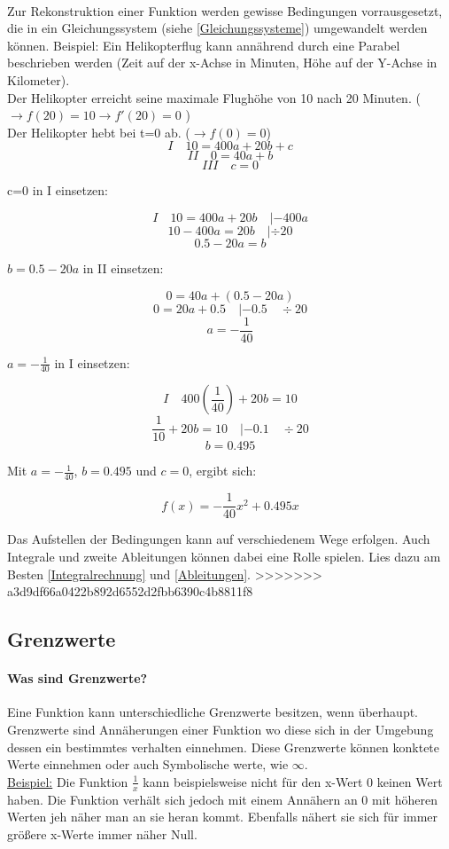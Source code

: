 \documentclass{article}
\begin{document}
\paragraph{}
Zur Rekonstruktion einer Funktion werden gewisse Bedingungen vorrausgesetzt, die in ein Gleichungssystem (siehe \ref{Gleichungssysteme}) umgewandelt werden können.
Beispiel: Ein Helikopterflug kann annährend durch eine Parabel beschrieben werden (Zeit auf der x-Achse in Minuten, Höhe auf der Y-Achse in Kilometer). \\
Der Helikopter erreicht seine maximale Flughöhe von 10 nach 20 Minuten. ( $ \rightarrow f(20)=10 \rightarrow f'(20)=0 $ ) \\
Der Helikopter hebt bei t=0 ab. ($ \rightarrow f(0)=0$) \\

\[ I \quad 10=400a+20b+c \]
\[ II \quad 0=40a+b \]
\[ III \quad c=0 \]

c=0 in I einsetzen:

\[I \quad 10=400a+20b \quad |-400a \]
\[ 10-400a=20b \quad | \div 20\]
\[ 0.5-20a=b\]

$b= 0.5-20a $ in II einsetzen:

\[ 0=40a+(0.5-20a)\]
\[ 0=20a+0.5 \quad |-0.5 \quad \div 20\]
\[ a=-\frac{1}{40} \]

$a=-\frac{1}{40}$ in I einsetzen:

\[ I \quad 400(\frac{1}{40})+20b=10 \]
\[ \frac{1}{10}+20b=10 \quad |-0.1 \quad \div 20\]
\[ b=0.495\]

Mit $a=-\frac{1}{40}$, $b=0.495$ und $c=0$, ergibt sich:

\[f(x)=-\frac{1}{40}x^2+0.495x\]

Das Aufstellen der Bedingungen kann auf verschiedenem Wege erfolgen. Auch Integrale und zweite Ableitungen können dabei eine Rolle spielen.
Lies dazu am Besten \ref{Integralrechnung} und \ref{Ableitungen}.
>>>>>>> a3d9df66a0422b892d6552d2fbb6390c4b8811f8

	\subsection{Grenzwerte}
		\paragraph{Was sind Grenzwerte?} \label{Definitionsbereich}
			Eine Funktion kann unterschiedliche Grenzwerte besitzen, wenn überhaupt. Grenzwerte sind Annäherungen einer Funktion wo diese sich in der Umgebung dessen ein bestimmtes verhalten einnehmen. Diese Grenzwerte können konktete Werte einnehmen oder auch Symbolische werte, wie $\infty$. \\
			\underline{Beispiel:} Die Funktion $ \frac {1} {x}$ kann beispielsweise nicht für den x-Wert $0$ keinen Wert haben. Die Funktion verhält sich jedoch mit einem Annähern an $0$ mit höheren Werten jeh näher man an sie heran kommt. Ebenfalls nähert sie sich für immer größere x-Werte immer näher Null.
			
\end{document}
